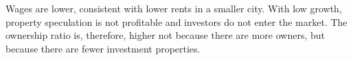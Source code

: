 Wages are lower, consistent with lower rents in a smaller city. With low growth, property speculation is not profitable and investors do not enter the market. The ownership ratio is, therefore, higher not because there are more owners, but because there are fewer investment properties. 

\newpage
